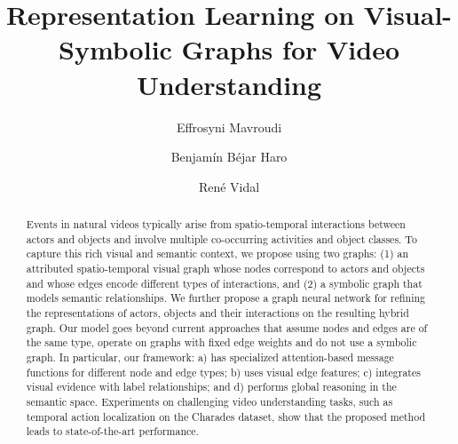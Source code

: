 \documentclass[runningheads]{llncs}
\begin{document}
\pagestyle{headings}
\mainmatter
\def\ECCVSubNumber{6535}  

\title{Representation Learning on Visual-Symbolic Graphs for Video Understanding} 

\begin{comment}
\titlerunning{ECCV-20 submission ID \ECCVSubNumber} 
\authorrunning{ECCV-20 submission ID \ECCVSubNumber} 
\author{Anonymous ECCV submission}
\institute{Paper ID \ECCVSubNumber}
\end{comment}


\author{Effrosyni Mavroudi \and
Benjam\'in B\'ejar Haro \and
Ren\'e Vidal}
\maketitle

\begin{abstract}
Events in natural videos typically arise from spatio-temporal
interactions between actors and objects and involve multiple co-occurring
activities and object classes. 
To capture this rich visual and semantic context, we propose using two graphs:
(1) an attributed spatio-temporal visual graph whose nodes correspond to
actors and objects and whose edges encode different types of interactions,
and (2) a symbolic graph that models semantic relationships.
We further propose a graph neural network for refining the representations of 
actors, objects and their interactions on the resulting hybrid graph. Our 
model goes beyond current approaches that assume nodes and edges are of the 
same type, operate on graphs with fixed edge weights and do not use a symbolic graph. 
In particular, our framework: 
a) has specialized attention-based message 
functions for different node and edge types; b) uses visual edge features; 
c) integrates visual evidence with label relationships; and d) performs global 
reasoning in the semantic space.
Experiments on challenging video understanding tasks, such as temporal action 
localization on the Charades dataset, show that the proposed method leads to 
state-of-the-art performance.
\end{abstract}
 
\end{document}
